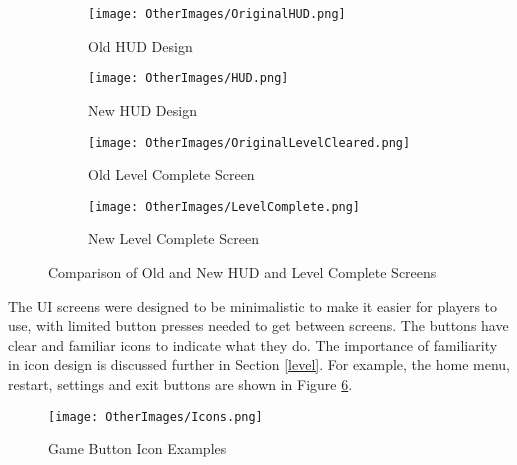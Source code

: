 \documentclass[10pt]{final_report}
\begin{document}
\begin{figure}[H]
    \centering
    \begin{subfigure}{0.45\textwidth}
        \centering
        \texttt{[image: OtherImages/OriginalHUD.png]}
        \caption{Old HUD Design}
        \label{fig:old_hud}
    \end{subfigure}
    \hfill
    \begin{subfigure}{0.45\textwidth}
        \centering
        \texttt{[image: OtherImages/HUD.png]}
        \caption{New HUD Design}
        \label{fig:new_hud}
    \end{subfigure}
    
    \vspace{1em} %

    \begin{subfigure}{0.45\textwidth}
        \centering
        \texttt{[image: OtherImages/OriginalLevelCleared.png]}
        \caption{Old Level Complete Screen}
        \label{fig:old_complete}
    \end{subfigure}
    \hfill
    \begin{subfigure}{0.45\textwidth}
        \centering
        \texttt{[image: OtherImages/LevelComplete.png]}
        \caption{New Level Complete Screen}
        \label{fig:new_complete}
    \end{subfigure}

    \caption{Comparison of Old and New HUD and Level Complete Screens}
    \label{fig:hud_comparison}
\end{figure}
The UI screens were designed to be minimalistic to make it easier for players to use, with limited button presses needed to get between screens. The buttons have clear and familiar icons to indicate what they do. The importance of familiarity in icon design is discussed further in Section \ref{level}. For example, the home menu, restart, settings and exit buttons are shown in Figure \ref{fig:label_icons}. 

\begin{figure}[H]
    \centering
    \texttt{[image: OtherImages/Icons.png]}
    \caption{Game Button Icon Examples}
    \label{fig:label_icons}
\end{figure}
\end{document}
